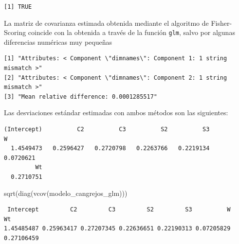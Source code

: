 \documentclass[
  letterpaper,
  DIV=11,
  numbers=noendperiod]{scrartcl}
\newenvironment{Shaded}{\begin{snugshade}}{\end{snugshade}}
\newcommand{\FunctionTok}[1]{\textcolor[rgb]{0.28,0.35,0.67}{#1}}
\newcommand{\NormalTok}[1]{\textcolor[rgb]{0.00,0.23,0.31}{#1}}
\newcommand{\SpecialCharTok}[1]{\textcolor[rgb]{0.37,0.37,0.37}{#1}}
\begin{document}
\begin{verbatim}
[1] TRUE
\end{verbatim}

La matriz de covarianza estimada obtenida mediante el algoritmo de
Fisher-Scoring coincide con la obtenida a través de la función
\texttt{glm}, salvo por algunas diferencias numéricas muy pequeñas

\begin{Shaded}
\end{Shaded}

\begin{verbatim}
[1] "Attributes: < Component \"dimnames\": Component 1: 1 string mismatch >"
[2] "Attributes: < Component \"dimnames\": Component 2: 1 string mismatch >"
[3] "Mean relative difference: 0.0001285517"                                
\end{verbatim}

Las desviaciones estándar estimadas con ambos métodos son las
siguientes:

\begin{Shaded}
\end{Shaded}

\begin{verbatim}
(Intercept)          C2          C3          S2          S3           W 
  1.4549473   0.2596427   0.2720798   0.2263766   0.2219134   0.0720621 
         Wt 
  0.2710751 
\end{verbatim}

\begin{Shaded}
\begin{Highlighting}[]
\FunctionTok{sqrt}\NormalTok{(}\FunctionTok{diag}\NormalTok{(}\FunctionTok{vcov}\NormalTok{(modelo\_cangrejos\_glm)))}
\end{Highlighting}
\end{Shaded}

\begin{verbatim}
 Intercept         C2         C3         S2         S3          W         Wt 
1.45485487 0.25963417 0.27207345 0.22636651 0.22190313 0.07205829 0.27106459 
\end{verbatim}
\end{document}
